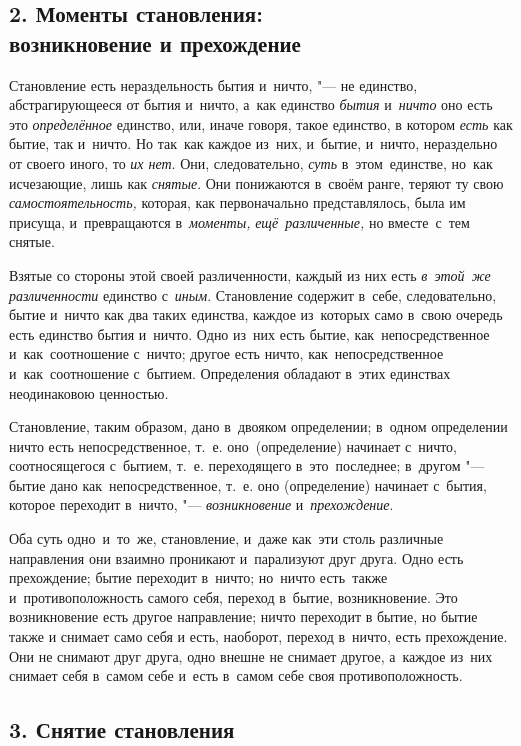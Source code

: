 \subsection%
[2. Моменты становления: возникновение и прехождение]%
{2. Моменты становления:\\возникновение и прехождение}

Становление есть нераздельность бытия и~ничто, "--- не единство,
абстрагирующееся от бытия и~ничто, а~как единство {\em бытия} и~{\em ничто} оно
есть это {\em определённое} единство, или, иначе говоря, такое единство, в
котором {\em есть} как бытие, так и~ничто. Но так~как каждое из~них, и~бытие,
и~ничто, нераздельно от своего иного, то {\em их нет}. Они, следовательно,
{\em суть} в~этом~единстве, но~как исчезающие, лишь как {\em снятые}. Они
понижаются в~своём ранге, теряют ту свою {\em самостоятельность,} которая, как
первоначально представлялось, была им присуща, и~превращаются в~{\em моменты,}
{\em ещё~различенные,} но вместе~с~тем снятые.

Взятые со стороны этой своей различенности, каждый из них есть
{\em в~этой~же различенности} единство с~{\em иным}. Становление содержит
в~себе, следовательно, бытие и~ничто как два таких единства, каждое из~которых
само в~свою очередь есть единство бытия и~ничто. Одно из~них есть бытие,
как~непосредственное и~как~соотношение с~ничто; другое есть ничто,
как~непосредственное и~как~соотношение с~бытием. Определения обладают в~этих
единствах неодинаковою ценностью.

Становление, таким образом, дано в~двояком определении; в~одном определении
ничто есть непосредственное, т.~е. оно~(определение) начинает с~ничто,
соотносящегося с~бытием, т.~е. переходящего в~это~последнее; в~другом "---
бытие дано как~непосредственное, т.~е. оно (определение) начинает с~бытия,
которое переходит в~ничто, "--- {\em возникновение} и~{\em прехождение}.

Оба суть одно~и~то~же, становление, и~даже как~эти столь различные направления
они взаимно проникают и~парализуют друг друга. Одно есть прехождение; бытие
переходит в~ничто; но~ничто есть~также и~противоположность самого себя, переход
в~бытие, возникновение. Это возникновение есть другое направление; ничто
переходит в бытие, но бытие также и снимает само себя и есть, наоборот, переход
в~ничто, есть прехождение. Они не снимают друг друга, одно внешне не снимает
другое, а~каждое из~них снимает себя в~самом себе и~есть в~самом себе своя
противоположность.

\subsection[3. Снятие становления]{3. Снятие становления}

